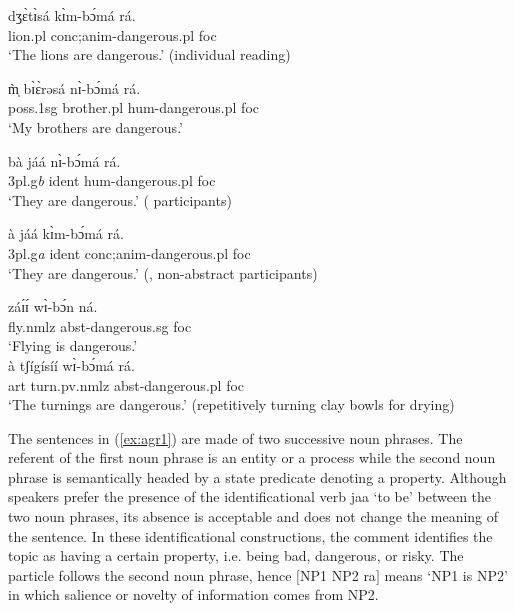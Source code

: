 \begin{exe}
\begin{exe}
\begin{exe}
\begin{exe}
\begin{exe}
\begin{exe}
\begin{exe}
\begin{exe}
\begin{exe}
\begin{exe}
\begin{exe}
\ex\label{ex:agrB}
\gll dʒɛ̀tɪ̀sá kɪ̀m-bɔ́má  rá.\\
  lion.{\sc pl}  {\sc  conc;anim}-dangerous.{\sc pl} {\sc foc}\\
\glt  `The lions are {\sc dangerous}.' (individual reading) 



\ex\label{ex:agrD}
\gll   m̩̀ bɪ̀ɛ̀rəsá  nɪ̀-bɔ́má  rá.\\
{\sc poss.1sg} {brother.{\sc pl}}  {\sc hum}-dangerous.{\sc pl} {\sc foc}\\
\glt  `My brothers are {\sc dangerous}.'


\ex\label{ex:agrE}
\gll bà  jáá  nɪ̀-bɔ́má   rá.\\
{{\sc  3pl.g}{\it b}} {\sc ident} {\sc hum}-{dangerous.{\sc pl}} {\sc foc}\\
\glt  `They are {\sc dangerous}.' ( participants) 



\ex\label{ex:agrF}
\gll   à   jáá   kɪ̀m-bɔ́má  rá.\\
{{\sc  3pl.g}{\it a}} {\sc ident}  {\sc  conc;anim}-{dangerous.{\sc pl}}
{\sc foc}\\
\glt  `They are {\sc dangerous}.' (, non-abstract participants) 



\ex\label{ex:agrG}
\gll záɪ́ɪ́   wɪ̀-bɔ́n ná.\\
 fly.{\sc nmlz} {\sc abst}-dangerous.{\sc sg}  {\sc foc}\\
\glt  `Flying is {\sc dangerous}.'\\




\ex\label{ex:agrH}
\gll à tʃígísíí wɪ̀-bɔ́má rá.\\
{\sc art}  turn.{\sc pv.nmlz}  {\sc abst}-dangerous.{\sc pl}  {\sc 
foc}
\\
\glt  `The turnings  are {\sc dangerous}.' (repetitively turning clay bowls for
drying)\\


\z 
 \z

The sentences in (\ref{ex:agr1})  are made of two successive noun phrases. The referent of the 
first 
noun phrase is an entity or a process while the second noun phrase is semantically headed by a 
state 
predicate denoting a property.  Although speakers prefer the presence of   the  identificational 
verb {\sls jaa} `to be' between the two noun phrases, its  absence is acceptable and does not 
change 
the meaning of the sentence. In these  identificational constructions,  the comment identifies the 
topic as having a certain property, i.e. being bad, dangerous, or risky. The  particle follows 
the second noun phrase, hence  $[$NP1 NP2 ra$]$  means `NP1 is NP2' in which salience or novelty of 
information comes from NP2. 



\end{exe}
\end{exe}
\end{exe}
\end{exe}
\end{exe}
\end{exe}
\end{exe}
\end{exe}
\end{exe}
\end{exe}
\end{exe}
